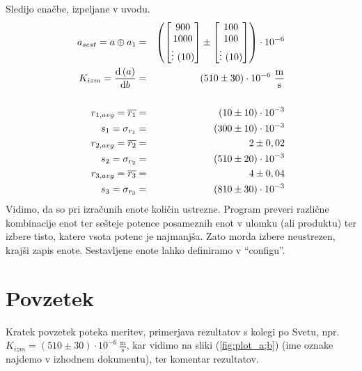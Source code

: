 \documentclass[12pt,a4paper]{article}
\newcommand{\qmarks}[1]{``{#1}''}
\begin{document}
\pagebreak
Sledijo enačbe, izpeljane v uvodu.
\begin{eqnarray*}
	a_{sest}	 =  a \oplus a_{1} &=& \left( \begin{bmatrix}900 \\1000 \\\vdots\ (10) \\\end{bmatrix} \pm \begin{bmatrix}100 \\100 \\\vdots\ (10) \\\end{bmatrix} \right) \cdot 10^{-6}\\ 
	K_{izm}	 =  \derivative{\left(a\right)}{b} &=& \left( 510 \pm 30 \right) \cdot 10^{-6}\ \frac{\mathrm{m}}{\mathrm{s}}\\ 
	\\
	r_{1,avg}	 =  \overline{r_{1}} &=& \left( 10 \pm 10 \right) \cdot 10^{-3}\\ 
	s_{1}	 =  \sigma_{r_{1}} &=& \left( 300 \pm 10 \right) \cdot 10^{-3}\\ 
	r_{2,avg}	 =  \overline{r_{2}} &=& 2 \pm 0,02\\ 
	s_{2}	 =  \sigma_{r_{2}} &=& \left( 510 \pm 20 \right) \cdot 10^{-3}\\ 
	r_{3,avg}	 =  \overline{r_{3}} &=& 4 \pm 0,04\\ 
	s_{3}	 =  \sigma_{r_{3}} &=& \left( 810 \pm 30 \right) \cdot 10^{-3}\\ 
\end{eqnarray*}
Vidimo, da so pri izračunih enote količin ustrezne. Program preveri različne kombinacije enot ter sešteje potence posameznih enot v ulomku (ali produktu) ter izbere tisto, katere vsota potenc je najmanjša. Zato morda izbere neustrezen, krajši zapis enote. Sestavljene enote lahko definiramo v \qmarks{configu}.

\pagebreak
\section{Povzetek}
Kratek povzetek poteka meritev, primerjava rezultatov s kolegi po Svetu, npr. $K_{izm} = \left( 510 \pm 30 \right) \cdot 10^{-6}\ \frac{\mathrm{m}}{\mathrm{s}}$, kar vidimo na sliki (\ref{fig:plot_a;b}) (ime oznake najdemo v izhodnem dokumentu), ter komentar rezultatov.
\end{document}

